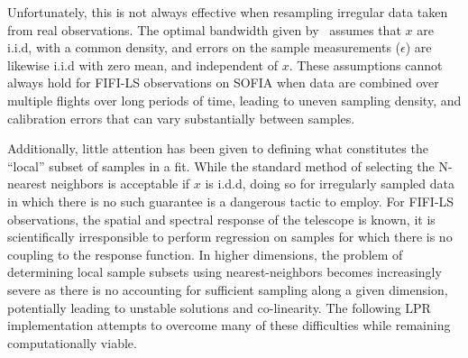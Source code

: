 Unfortunately, this is not always effective when resampling irregular data
taken from real observations.
The optimal bandwidth given by~\citep{Gu15} assumes that $x$ are i.i.d, with
a common density, and errors on the sample measurements ($\epsilon$) are likewise
i.i.d with zero mean, and independent of $x$.
These assumptions cannot always hold for FIFI-LS observations on SOFIA when
data are combined over multiple flights over long periods of time, leading to
uneven sampling density, and calibration errors that can vary substantially
between samples.

Additionally, little attention has been given to defining what constitutes the
``local'' subset of samples in a fit.
While the standard method of selecting the N-nearest neighbors is acceptable
if $x$ is i.d.d, doing so for irregularly sampled data in which there is no such
guarantee is a dangerous tactic to employ.
For FIFI-LS observations, the spatial and spectral response of the telescope is
known, it is scientifically irresponsible to perform regression on samples for
which there is no coupling to the response function.
In higher dimensions, the problem of determining local sample subsets using
nearest-neighbors becomes increasingly severe as there is no accounting for
sufficient sampling along a given dimension, potentially leading to unstable
solutions and co-linearity.
The following LPR implementation attempts to overcome many of these
difficulties while remaining computationally viable.
